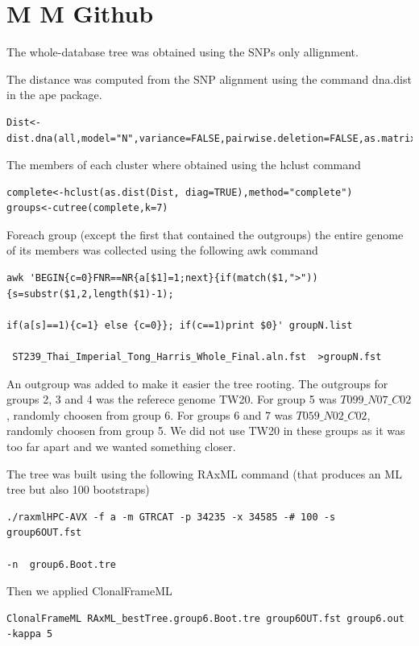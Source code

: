 \documentclass[12pt,a4paper]{article}
\author{Alice Ledda}
\title{}
\begin{document}
\section{M  M  Github}
The whole-database tree was obtained using the SNPs only allignment.

The distance was computed from the SNP alignment using the command dna.dist in the ape package.
\begin{verbatim}
Dist<-dist.dna(all,model="N",variance=FALSE,pairwise.deletion=FALSE,as.matrix=TRUE)
\end{verbatim}


The members of each cluster where obtained using the hclust command

\begin{verbatim}
complete<-hclust(as.dist(Dist, diag=TRUE),method="complete")
groups<-cutree(complete,k=7)
\end{verbatim}

Foreach group (except the first that contained the outgroups) the entire genome of its members was collected using the following awk command

\begin{verbatim}
awk 'BEGIN{c=0}FNR==NR{a[$1]=1;next}{if(match($1,">")){s=substr($1,2,length($1)-1); 

if(a[s]==1){c=1} else {c=0}}; if(c==1)print $0}' groupN.list

 ST239_Thai_Imperial_Tong_Harris_Whole_Final.aln.fst  >groupN.fst
\end{verbatim}

An outgroup was added to make it easier the tree rooting. The outgroups for groups 2, 3 and 4 was the referece genome TW20. For group 5 was $T099\_N07\_C02$, randomly choosen from group 6. For groups 6 and 7 was $T059\_N02\_C02$, randomly choosen from group 5. We did not use TW20 in these groups as it was too far apart and we wanted something closer.

The tree was built using the following RAxML command (that produces an ML tree but also 100 bootstraps)
\begin{verbatim}
./raxmlHPC-AVX -f a -m GTRCAT -p 34235 -x 34585 -# 100 -s group6OUT.fst  

-n  group6.Boot.tre
\end{verbatim}

Then we applied ClonalFrameML
\begin{verbatim}
ClonalFrameML RAxML_bestTree.group6.Boot.tre group6OUT.fst group6.out -kappa 5
\end{verbatim}
\end{document}
